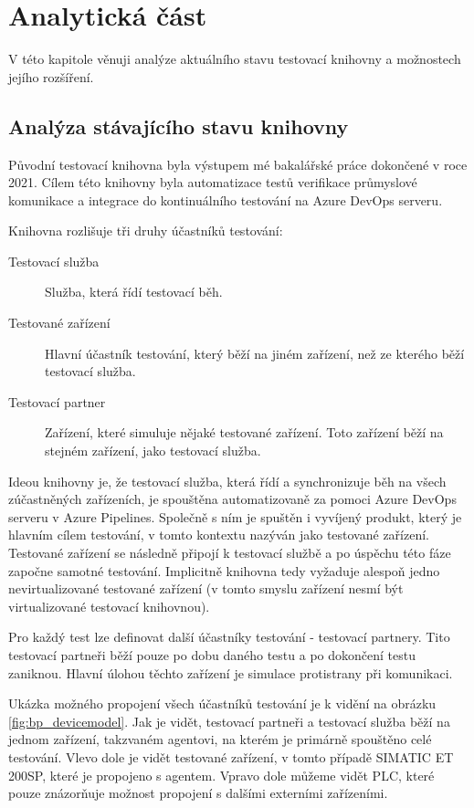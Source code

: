 \chapter{Analytická část}\label{chap:anal}

V této kapitole věnuji analýze aktuálního stavu testovací knihovny a možnostech jejího rozšíření.


\section{Analýza stávajícího stavu knihovny}

Původní testovací knihovna byla výstupem mé bakalářské práce\cite{bakalarka} dokončené v roce 2021. Cílem této knihovny byla automatizace testů verifikace průmyslové komunikace a integrace do kontinuálního testování na Azure DevOps serveru. 

Knihovna rozlišuje tři druhy účastníků testování:

\begin{description}
    \item[Testovací služba] Služba, která řídí testovací běh.
    \item[Testované zařízení] Hlavní účastník testování, který běží na jiném zařízení, než ze kterého běží testovací služba. 
    \item[Testovací partner] Zařízení, které simuluje nějaké testované zařízení. Toto zařízení běží na stejném zařízení, jako testovací služba. 
\end{description}

Ideou knihovny je, že testovací služba, která řídí a synchronizuje běh na všech zúčastněných zařízeních, je spouštěna automatizovaně za pomoci Azure DevOps serveru v Azure Pipelines. Společně s ním je spuštěn i vyvíjený produkt, který je hlavním cílem testování, v tomto kontextu nazýván jako testované zařízení. Testované zařízení se následně připojí k testovací službě a po úspěchu této fáze započne samotné testování. Implicitně knihovna tedy vyžaduje alespoň jedno nevirtualizované testované zařízení (v tomto smyslu zařízení nesmí být virtualizované testovací knihovnou). 

Pro každý test lze definovat další účastníky testování - testovací partnery. Tito testovací partneři běží pouze po dobu daného testu a po dokončení testu zaniknou. Hlavní úlohou těchto zařízení je simulace protistrany při komunikaci. 

Ukázka možného propojení všech účastníků testování je k vidění na obrázku \ref{fig:bp_devicemodel}. Jak je vidět, testovací partneři a testovací služba běží na jednom zařízení, takzvaném agentovi, na kterém je primárně spouštěno celé testování. Vlevo dole je vidět testované zařízení, v tomto případě SIMATIC ET 200SP, které je propojeno s agentem. Vpravo dole můžeme vidět PLC, které pouze znázorňuje možnost propojení s dalšími externími zařízeními.

